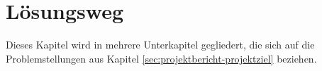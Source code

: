 \section{Lösungsweg} \label{sec:projektbericht-loesungsweg}

Dieses Kapitel wird in mehrere Unterkapitel gegliedert, die sich auf die Problemstellungen aus Kapitel \ref{sec:projektbericht-projektziel} beziehen.






